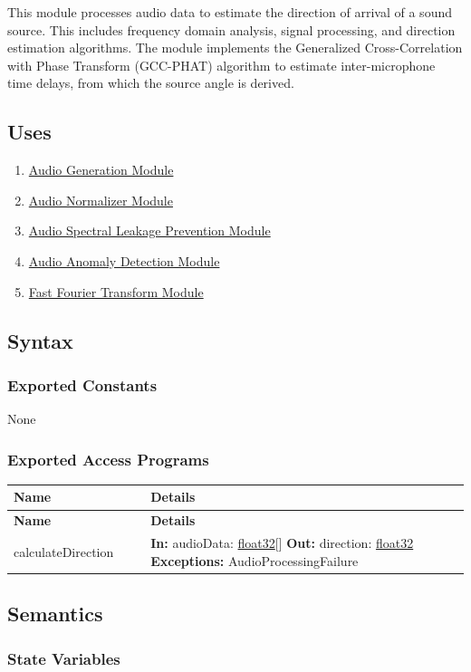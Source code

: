\documentclass[12pt, titlepage]{article}
\newenvironment{apitable}{%
\begin{center}
\begin{longtable}{|p{0.3\linewidth}|p{0.7\linewidth}|} 
\hline
\textbf{Name} & \textbf{Details} \\
\hline
\endfirsthead
\hline
\textbf{Name} & \textbf{Details} \\
\hline
\endhead
\hline
\endfoot
\hline
\endlastfoot
}{%
\end{longtable}
\end{center}
}
\newcommand{\apifunc}[4]{%
#1 & 
\textbf{In:} #2 \newline
\textbf{Out:} #3 \newline
\textbf{Exceptions:} #4 \\
\hline
}
\begin{document}
This module processes audio data to estimate the direction of arrival of a sound
source. This includes frequency domain analysis, signal processing, and
direction estimation algorithms. The module implements the Generalized
Cross-Correlation with Phase Transform (GCC-PHAT) algorithm to estimate
inter-microphone time delays, from which the source angle is derived.

\subsection{Uses}

\begin{enumerate}
  \item \hyperref[mod:AudioGen]{Audio Generation Module}
  \item \hyperref[mod:AudioNormalizer]{Audio Normalizer Module} 
  \item \hyperref[mod:AudioSpectralLeakage]{Audio Spectral Leakage Prevention
    Module}
  \item \hyperref[mod:AudioAnomaly]{Audio Anomaly Detection Module}
  \item \hyperref[mod:FFT]{Fast Fourier Transform Module}
\end{enumerate}

\subsection{Syntax}

\subsubsection{Exported Constants}

None

\subsubsection{Exported Access Programs}
\begin{apitable}
  \apifunc{calculateDirection}
    {audioData: \hyperref[generic:float32]{float32}[]}
    {direction: \hyperref[generic:float32]{float32}}
    {AudioProcessingFailure}
\end{apitable}

\subsection{Semantics}

\subsubsection{State Variables}
\end{document}
